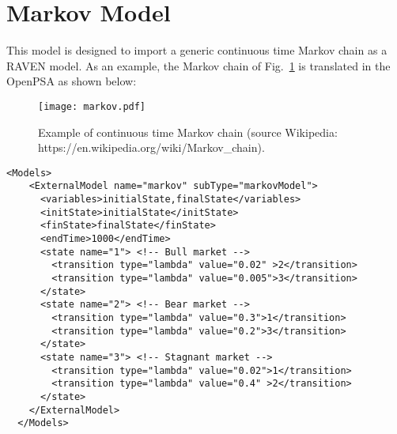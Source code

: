 \section{Markov Model}
\label{sec:MarkovModel}

This model is designed to import a generic continuous time Markov chain as a RAVEN model.
As an example, the Markov chain of Fig.~\ref{fig:markov} is translated in the OpenPSA as shown below:

\begin{figure}
    \centering
    \centerline{\texttt{[image: markov.pdf]}} 
    \caption{Example of continuous time Markov chain (source Wikipedia: https://en.wikipedia.org/wiki/Markov\_chain).}
    \label{fig:markov}
\end{figure}

\begin{lstlisting}[style=XML,morekeywords={anAttribute},caption=MarkovModel input example., label=lst:Markov_InputExample]
  <Models>
    <ExternalModel name="markov" subType="markovModel">
      <variables>initialState,finalState</variables>
      <initState>initialState</initState>
      <finState>finalState</finState>
      <endTime>1000</endTime>
      <state name="1"> <!-- Bull market -->
        <transition type="lambda" value="0.02" >2</transition>
        <transition type="lambda" value="0.005">3</transition>
      </state>
      <state name="2"> <!-- Bear market -->
        <transition type="lambda" value="0.3">1</transition>
        <transition type="lambda" value="0.2">3</transition>
      </state>
      <state name="3"> <!-- Stagnant market -->
        <transition type="lambda" value="0.02">1</transition>
        <transition type="lambda" value="0.4" >2</transition>
      </state>      
    </ExternalModel>
  </Models>
\end{lstlisting}

